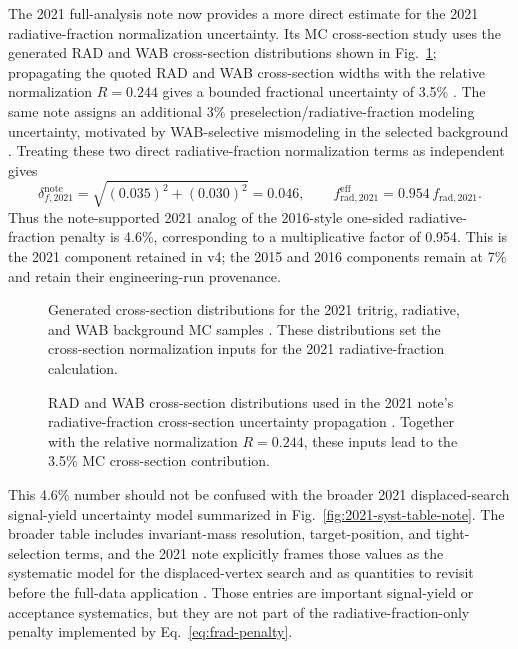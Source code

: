 The 2021 full-analysis note now provides a more direct estimate for the 2021
radiative-fraction normalization uncertainty. Its MC cross-section study uses the
generated RAD and WAB cross-section distributions shown in
Fig.~\ref{fig:2021-radfrac-xsec-note}; propagating the quoted RAD and WAB
cross-section widths with the relative normalization $R=0.244$ gives a bounded
fractional uncertainty of 3.5\% \cite[Sec.~9.1, Fig.~161]{HPS2021FullAnalysisNote}.
The same note assigns an additional 3\% preselection/radiative-fraction modeling
uncertainty, motivated by WAB-selective mismodeling in the selected background
\cite[Sec.~9.2]{HPS2021FullAnalysisNote}. Treating these two direct
radiative-fraction normalization terms as independent gives
\begin{equation}
\delta_{f,2021}^{\mathrm{note}}
= \sqrt{(0.035)^2 + (0.030)^2}
= 0.046,
\qquad
f_{\mathrm{rad},2021}^{\mathrm{eff}}
= 0.954\,f_{\mathrm{rad},2021}.
\label{eq:frad-2021-note-penalty}
\end{equation}
Thus the note-supported 2021 analog of the 2016-style one-sided radiative-fraction
penalty is 4.6\%, corresponding to a multiplicative factor of 0.954. This is the 2021
component retained in v4; the 2015 and 2016 components remain at 7\% and retain their
engineering-run provenance.

\begin{figure}[H]
\centering
{}
\caption{Generated cross-section distributions for the 2021 tritrig, radiative, and
WAB background MC samples \cite{HPS2021FullAnalysisNote}. These distributions set the
cross-section normalization inputs for the 2021 radiative-fraction calculation.}
\label{fig:2021-radfrac-xsec-note}
\end{figure}

\begin{figure}[H]
\centering
{}
\caption{RAD and WAB cross-section distributions used in the 2021 note's
radiative-fraction cross-section uncertainty propagation \cite{HPS2021FullAnalysisNote}.
Together with the relative normalization $R=0.244$, these inputs lead to the 3.5\%
MC cross-section contribution.}
\label{fig:2021-radfrac-xsec-syst-note}
\end{figure}

This 4.6\% number should not be confused with the broader 2021 displaced-search
signal-yield uncertainty model summarized in Fig.~\ref{fig:2021-syst-table-note}. The
broader table includes invariant-mass resolution, target-position, and tight-selection
terms, and the 2021 note explicitly frames those values as the systematic model for
the displaced-vertex search and as quantities to revisit before the full-data
application \cite[Sec.~9, Table~58]{HPS2021FullAnalysisNote}. Those entries are
important signal-yield or acceptance systematics, but they are not part of the
radiative-fraction-only penalty implemented by Eq.~\eqref{eq:frad-penalty}.

